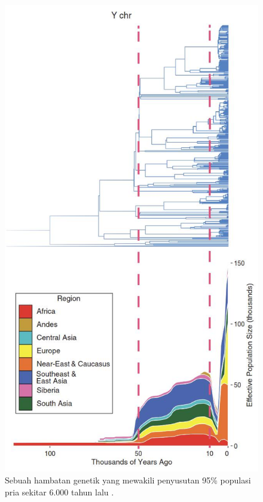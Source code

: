 \documentclass[10pt,twocolumn,letterpaper]{article}
\begin{document}
\begin{figure}[t]
\begin{center}
   \includegraphics[width=1\linewidth]{bottleneck.jpg}
\end{center}
   \caption{Sebuah hambatan genetik yang mewakili penyusutan 95\% populasi pria sekitar 6.000 tahun lalu \cite{62}.}
\label{fig:10}
\label{fig:onecol}
\end{figure}
\end{document}
